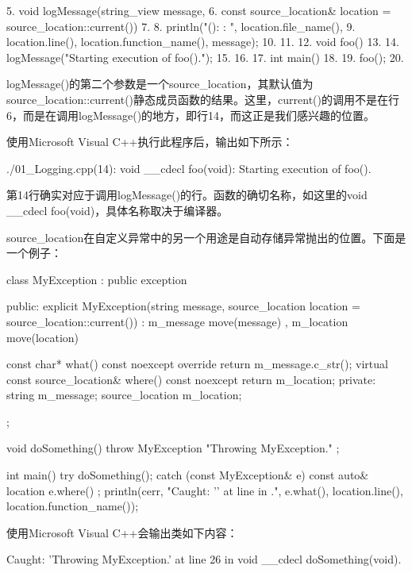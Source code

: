 \begin{shell}
5.  void logMessage(string_view message,
6.  const source_location& location = source_location::current())
7.  {
8.      println("{}({}): {}: {}", location.file_name(),
9.      location.line(), location.function_name(), message);
10. }
11.
12. void foo()
13. {
14.     logMessage("Starting execution of foo().");
15. }
16.
17. int main()
18. {
19.     foo();
20. }
\end{shell}

logMessage()的第二个参数是一个source\_location，其默认值为source\_location::current()静态成员函数的结果。这里，current()的调用不是在行6，而是在调用logMessage()的地方，即行14，而这正是我们感兴趣的位置。

使用Microsoft Visual C++执行此程序后，输出如下所示：

\begin{shell}
./01_Logging.cpp(14): void __cdecl foo(void): Starting execution of foo().
\end{shell}

第14行确实对应于调用logMessage()的行。函数的确切名称，如这里的void \_\_cdecl foo(void)，具体名称取决于编译器。


source\_location在自定义异常中的另一个用途是自动存储异常抛出的位置。下面是一个例子：

\begin{cpp}
class MyException : public exception
{
    public:
        explicit MyException(string message,
            source_location location = source_location::current())
            : m_message { move(message) }
            , m_location { move(location) }
        { }

        const char* what() const noexcept override { return m_message.c_str(); }
        virtual const source_location& where() const noexcept{ return m_location; }
    private:
        string m_message;
        source_location m_location;
};

void doSomething()
{
    throw MyException { "Throwing MyException." };
}

int main()
{
    try {
        doSomething();
    } catch (const MyException& e) {
        const auto& location { e.where() };
        println(cerr, "Caught: '{}' at line {} in {}.",
            e.what(), location.line(), location.function_name());
    }
}
\end{cpp}

使用Microsoft Visual C++会输出类如下内容：

\begin{shell}
Caught: 'Throwing MyException.' at line 26 in void __cdecl doSomething(void).
\end{shell}


























